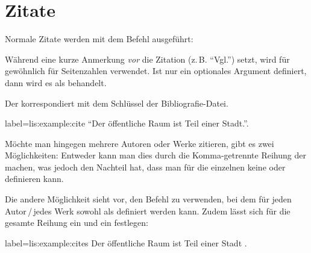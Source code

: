 \section{Zitate}\label{sec:zitate}\label{lit:cite-befehle}

Normale Zitate werden mit dem Befehl  ausgeführt:

Während   eine kurze Anmerkung \emph{vor} die Zitation (z.\,B. \enquote{Vgl.}) setzt, 
wird   für gewöhnlich für Seitenzahlen verwendet.
Ist nur ein optionales Argument definiert, 
dann wird es als  behandelt.
Der  korrespondiert mit dem Schlüssel der Bibliografie-Datei.

\begin{lfgwexample}{label={lis:example:cite}}
\enquote{Der öffentliche Raum ist Teil einer Stadt.}\cite{Osland2016}.
\end{lfgwexample}

Möchte man hingegen mehrere Autoren oder Werke zitieren, 
gibt es zwei Möglichkeiten:
Entweder kann man dies durch die Komma-getrennte Reihung der  machen,
was jedoch den Nachteil hat, dass man für die einzelnen  keine  oder  definieren kann.

Die andere Möglichkeit sieht vor, den Befehl  zu verwenden, 
bei dem für jeden Autor\,/\,jedes Werk sowohl  als  definiert werden kann.
Zudem lässt sich für die gesamte Reihung ein  und ein  festlegen:
\begin{lfgwexample}{label={lis:example:cites}}
Der öffentliche Raum ist Teil einer Stadt \cites(vgl.)(){Osland2016} {Evangelidis2014}.
\end{lfgwexample}
 
